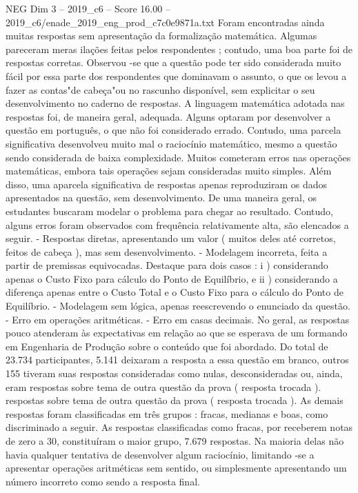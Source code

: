 \begin{textsample}{NEG Dim 3 – 2019\_c6 – Score 16.00 – 2019\_c6/enade\_2019\_eng\_prod\_c7c0e9871a.txt}
Foram encontradas ainda muitas respostas sem apresentação da formalização matemática.
Algumas pareceram meras ilações feitas pelos respondentes ; contudo, uma boa parte foi de respostas corretas.
Observou -se que a questão pode ter sido considerada muito fácil por essa parte dos respondentes que dominavam o assunto, o que os levou a fazer as contas"de cabeça"ou no rascunho disponível, sem explicitar o seu desenvolvimento no caderno de respostas.
A linguagem matemática adotada nas respostas foi, de maneira geral, adequada.
Alguns optaram por desenvolver a questão em português, o que não foi considerado errado.
Contudo, uma parcela significativa desenvolveu muito mal o raciocínio matemático, mesmo a questão sendo considerada de baixa complexidade.
Muitos cometeram erros nas operações matemáticas, embora tais operações sejam consideradas muito simples.
Além disso, uma aparcela significativa de respostas apenas reproduziram os dados apresentados na questão, sem desenvolvimento.
De uma maneira geral, os estudantes buscaram modelar o problema para chegar ao resultado.
Contudo, alguns erros foram observados com frequência relativamente alta, são elencados a seguir. - Respostas diretas, apresentando um valor ( muitos deles até corretos, feitos de cabeça ), mas sem desenvolvimento. - Modelagem incorreta, feita a partir de premissas equivocadas.
Destaque para dois casos : i ) considerando apenas o Custo Fixo para cálculo do Ponto de Equilíbrio, e ii ) considerando a diferença apenas entre o Custo Total e o Custo Fixo para o cálculo do Ponto de Equilíbrio. - Modelagem sem lógica, apenas reescrevendo o enunciado da questão. - Erro em operações aritméticas. - Erro em casas decimais.
No geral, as respostas pouco atenderam às expectativas em relação ao que se esperava de um formando em Engenharia de Produção sobre o conteúdo que foi abordado.
Do total de 23.734 participantes, 5.141 deixaram a resposta a essa questão em branco, outros 155 tiveram suas respostas consideradas como nulas, desconsideradas ou, ainda, eram respostas sobre tema de outra questão da prova ( resposta trocada ). respostas sobre tema de outra questão da prova ( resposta trocada ).
As demais respostas foram classificadas em três grupos : fracas, medianas e boas, como discriminado a seguir.
As respostas classificadas como fracas, por receberem notas de zero a 30, constituíram o maior grupo, 7.679 respostas.
Na maioria delas não havia qualquer tentativa de desenvolver algum raciocínio, limitando -se a apresentar operações aritméticas sem sentido, ou simplesmente apresentando um número incorreto como sendo a resposta final.

\end{textsample}
